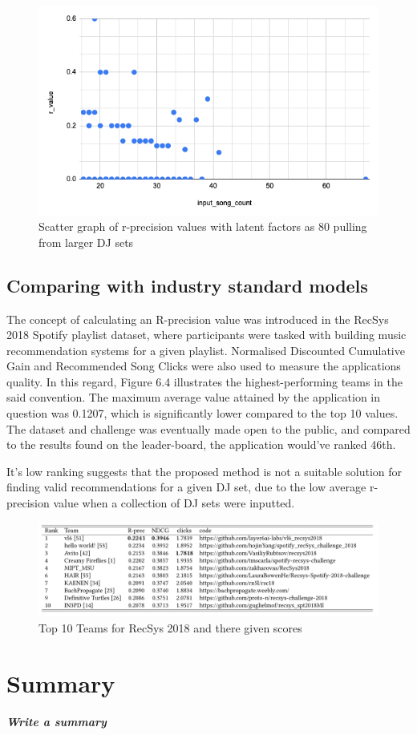 \begin{figure}[H]
	\includegraphics[scale=0.6]{images/80_big_sets}
	\centering
	\caption{Scatter graph of r-precision values with latent factors as 80 pulling from larger DJ sets} 
\end{figure}


\subsection{Comparing with industry standard models}

The concept of calculating an R-precision value was introduced in the RecSys 2018 Spotify playlist dataset, where participants were tasked with building music recommendation systems for a given playlist. Normalised Discounted Cumulative Gain and Recommended Song Clicks were also used to measure the applications quality. In this regard, Figure 6.4 illustrates the highest-performing teams in the said convention. The maximum average value attained by the application in question was 0.1207, which is significantly lower compared to the top 10 values. The dataset and challenge was eventually made open to the public, and compared to the results found on the leader-board, the application would've ranked 46th. 

It's low ranking suggests that the proposed method is not a suitable solution for finding valid recommendations for a given DJ set, due to the low average r-precision value when a collection of DJ sets were inputted.
\begin{figure}[H]
	\hspace*{-1cm} 
	\includegraphics[scale=0.6]{images/recsys_scores}
	\caption{Top 10 Teams for RecSys 2018 and there given scores} 
\end{figure}

\section{Summary}
\textbf{\textit{Write a summary}}
